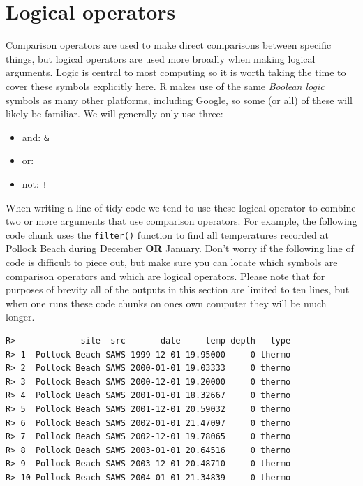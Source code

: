 \documentclass[]{book}
\newenvironment{Shaded}{\begin{snugshade}}{\end{snugshade}}
\newcommand{\KeywordTok}[1]{\textcolor[rgb]{0.13,0.29,0.53}{\textbf{#1}}}
\newcommand{\DecValTok}[1]{\textcolor[rgb]{0.00,0.00,0.81}{#1}}
\newcommand{\StringTok}[1]{\textcolor[rgb]{0.31,0.60,0.02}{#1}}
\newcommand{\OperatorTok}[1]{\textcolor[rgb]{0.81,0.36,0.00}{\textbf{#1}}}
\newcommand{\NormalTok}[1]{#1}
\providecommand{\tightlist}{%
  \setlength{\itemsep}{0pt}\setlength{\parskip}{0pt}}
\theoremstyle{definition}
\theoremstyle{definition}
\theoremstyle{definition}
\theoremstyle{remark}
\begin{document}
\section{Logical operators}\label{logical-operators}

Comparison operators are used to make direct comparisons between
specific things, but logical operators are used more broadly when making
logical arguments. Logic is central to most computing so it is worth
taking the time to cover these symbols explicitly here. R makes use of
the same \emph{Boolean logic} symbols as many other platforms, including
Google, so some (or all) of these will likely be familiar. We will
generally only use three:

\begin{itemize}
\tightlist
\item
  and: \texttt{\&}\\
\item
  or: \texttt{\textbar{}}\\
\item
  not: \texttt{!}
\end{itemize}

When writing a line of tidy code we tend to use these logical operator
to combine two or more arguments that use comparison operators. For
example, the following code chunk uses the \texttt{filter()} function to
find all temperatures recorded at Pollock Beach during December
\textbf{OR} January. Don't worry if the following line of code is
difficult to piece out, but make sure you can locate which symbols are
comparison operators and which are logical operators. Please note that
for purposes of brevity all of the outputs in this section are limited
to ten lines, but when one runs these code chunks on ones own computer
they will be much longer.

\begin{Shaded}
\end{Shaded}

\begin{verbatim}
R>             site  src       date     temp depth   type
R> 1  Pollock Beach SAWS 1999-12-01 19.95000     0 thermo
R> 2  Pollock Beach SAWS 2000-01-01 19.03333     0 thermo
R> 3  Pollock Beach SAWS 2000-12-01 19.20000     0 thermo
R> 4  Pollock Beach SAWS 2001-01-01 18.32667     0 thermo
R> 5  Pollock Beach SAWS 2001-12-01 20.59032     0 thermo
R> 6  Pollock Beach SAWS 2002-01-01 21.47097     0 thermo
R> 7  Pollock Beach SAWS 2002-12-01 19.78065     0 thermo
R> 8  Pollock Beach SAWS 2003-01-01 20.64516     0 thermo
R> 9  Pollock Beach SAWS 2003-12-01 20.48710     0 thermo
R> 10 Pollock Beach SAWS 2004-01-01 21.34839     0 thermo
\end{verbatim}
\end{document}
